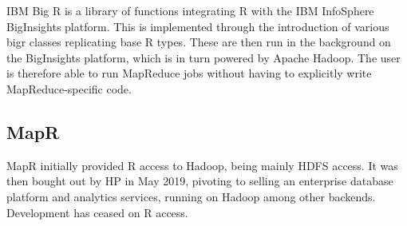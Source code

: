 \documentclass[10pt,a4paper]{article}
\begin{document}
IBM Big R is a library of functions integrating R with the IBM
InfoSphere BigInsights platform\cite{inc.14:_infos_bigin_big_r}. This
is implemented through the introduction of various bigr classes
replicating base R types. These are then run in the background on the
BigInsights platform, which is in turn powered by Apache Hadoop. The
user is therefore able to run MapReduce jobs without having to
explicitly write MapReduce-specific code.

\subsection{MapR}
\label{sec:mapr}

MapR initially provided R access to Hadoop, being mainly HDFS
access\cite{mapr19:_indus_next_gener_data_platf_ai_analy}. It was then
bought out by HP in May 2019, pivoting to selling an enterprise
database platform and analytics services, running on Hadoop among
other backends. Development has ceased on R access.


\printbibliography{}
\end{document}
